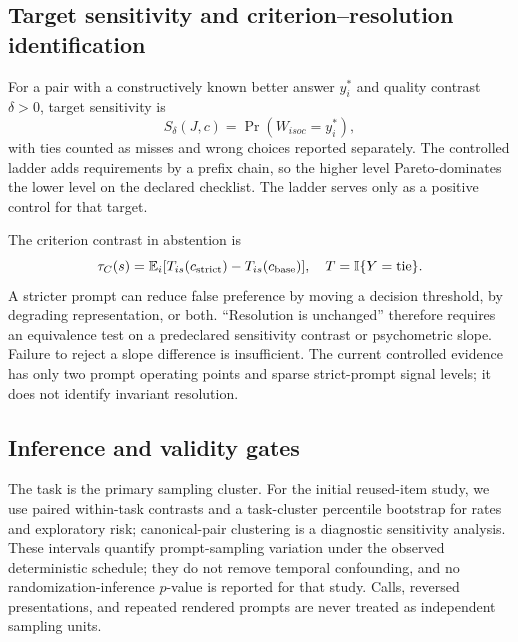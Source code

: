 \documentclass[10pt]{article}
\newcommand{\ind}{\mathbb{I}}
\begin{document}
\subsection{Target sensitivity and criterion--resolution identification}

For a pair with a constructively known better answer $y_i^*$ and quality contrast $\delta>0$, target sensitivity is
\[
S_\delta(J,c)=\Pr(W_{isoc}=y_i^*),
\]
with ties counted as misses and wrong choices reported separately. The controlled ladder adds requirements by a prefix chain, so the higher level Pareto-dominates the lower level on the declared checklist. The ladder serves only as a positive control for that target.

The criterion contrast in abstention is
\[
\tau_C(s)=\mathbb{E}_i[T_{is}(c_{\rm strict})-T_{is}(c_{\rm base})],
\quad T=\ind\{Y=\mathrm{tie}\}.
\]
A stricter prompt can reduce false preference by moving a decision threshold, by degrading representation, or both. ``Resolution is unchanged'' therefore requires an equivalence test on a predeclared sensitivity contrast or psychometric slope. Failure to reject a slope difference is insufficient. The current controlled evidence has only two prompt operating points and sparse strict-prompt signal levels; it does not identify invariant resolution.

\subsection{Inference and validity gates}

The task is the primary sampling cluster. For the initial reused-item study, we use paired within-task contrasts and a task-cluster percentile bootstrap for rates and exploratory risk; canonical-pair clustering is a diagnostic sensitivity analysis. These intervals quantify prompt-sampling variation under the observed deterministic schedule; they do not remove temporal confounding, and no randomization-inference $p$-value is reported for that study. Calls, reversed presentations, and repeated rendered prompts are never treated as independent sampling units.
\end{document}
